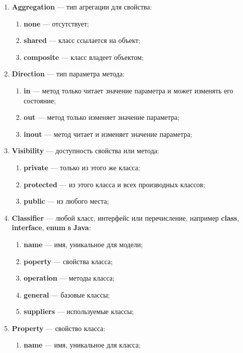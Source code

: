 \begin{enumerate}
\item \textbf{Aggregation} --- тип агрегации для свойства:
    \begin{enumerate}
    \item \textbf{none} --- отсутствует;
    \item \textbf{shared} --- класс ссылается на объект;
    \item \textbf{composite} --- класс владеет объектом;
    \end{enumerate}
\item \textbf{Direction} --- тип параметра метода:
    \begin{enumerate}
    \item \textbf{in} --- метод только читает значение параметра и может изменять его состояние;
    \item \textbf{out} --- метод только изменяет значение параметра;
    \item \textbf{inout} --- метод читает и изменяет значение параметра;
    \end{enumerate}
\item \textbf{Visibility} --- доступность свойства или метода:
    \begin{enumerate}
    \item \textbf{private} --- только из этого же класса;
    \item \textbf{protected} --- из этого класса и всех производных классов;
    \item \textbf{public} --- из любого места;
    \end{enumerate}
\item \textbf{Classifier} --- любой класс, интерфейс или перечисление, например \textbf{class}, \textbf{interface}, \textbf{enum} в \textbf{Java}:
    \begin{enumerate}
    \item \textbf{name} --- имя, уникальное для модели;
    \item \textbf{poperty} --- свойства класса;
    \item \textbf{operation} --- методы класса;
    \item \textbf{general} --- базовые классы;
    \item \textbf{suppliers} --- используемые классы;
    \end{enumerate}
\item \textbf{Property} --- свойство класса:
    \begin{enumerate}
    \item \textbf{name} --- имя, уникальное для класса;

\end{enumerate}
\end{enumerate}
